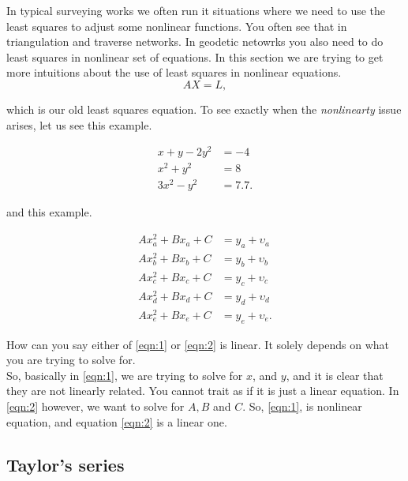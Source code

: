 \documentclass{llncs}
\begin{document}
In typical surveying works we often run it situations where we need to use the least squares to adjust some nonlinear functions. You often see that in triangulation and traverse networks. In geodetic netowrks you also need to do least squares in nonlinear set of equations. In this section we are trying to get more intuitions about the use of least squares in nonlinear equations. 
\begin{equation}
AX = L,
\end{equation}


which is our old least squares equation. To see exactly when the \textit{nonlinearty} issue arises, let us see this example.


\begin{align}
\label{eqn:1}
x + y - 2y^2 &= -4\\
x^2 + y^2 &= 8\\
3x^2 - y^2 &= 7.7.
\end{align}

and this example.

\begin{align}
\label{eqn:2}
A x_a^2 + B x_a + C &= y_a + \upsilon_a\\
A x_b^2 + B x_b + C &= y_b + \upsilon_b\\
A x_c^2 + B x_c + C &= y_c + \upsilon_c\\
A x_d^2 + B x_d + C &= y_d + \upsilon_d\\
A x_e^2 + B x_e + C &= y_e + \upsilon_e.
\end{align}

How can you say either of \eqref{eqn:1} or \eqref{eqn:2} is linear. It solely depends on what you are trying to solve for. 
\\
So, basically in \eqref{eqn:1}, we are trying to solve for $x$, and $y$, and it is clear that they are not linearly related.  You cannot trait as if it is just a linear equation. In \eqref{eqn:2} however, we want to solve for $A,B$ and $C$. So, \eqref{eqn:1}, is nonlinear equation, and equation \eqref{eqn:2} is a linear one.

\subsection{Taylor's series}



\clearpage
{} %
\renewcommand{\indexname}{Author Index}
\printindex
\clearpage
{} %
\renewcommand{\indexname}{Subject Index}

\end{document}
